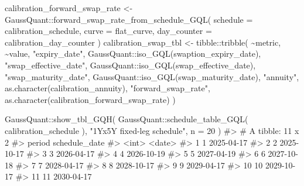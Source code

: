 \documentclass[
  letterpaper,
  DIV=11,
  numbers=noendperiod]{scrreprt}
\newenvironment{Shaded}{\begin{snugshade}}{\end{snugshade}}
\newcommand{\AttributeTok}[1]{\textcolor[rgb]{0.40,0.45,0.13}{#1}}
\newcommand{\CommentTok}[1]{\textcolor[rgb]{0.37,0.37,0.37}{#1}}
\newcommand{\DecValTok}[1]{\textcolor[rgb]{0.68,0.00,0.00}{#1}}
\newcommand{\FunctionTok}[1]{\textcolor[rgb]{0.28,0.35,0.67}{#1}}
\newcommand{\NormalTok}[1]{\textcolor[rgb]{0.00,0.23,0.31}{#1}}
\newcommand{\OtherTok}[1]{\textcolor[rgb]{0.00,0.23,0.31}{#1}}
\newcommand{\SpecialCharTok}[1]{\textcolor[rgb]{0.37,0.37,0.37}{#1}}
\newcommand{\StringTok}[1]{\textcolor[rgb]{0.13,0.47,0.30}{#1}}
\begin{document}
\begin{Shaded}
\begin{Highlighting}[]
\NormalTok{calibration\_forward\_swap\_rate }\OtherTok{\textless{}{-}}\NormalTok{ GaussQuant}\SpecialCharTok{::}\FunctionTok{forward\_swap\_rate\_from\_schedule\_GQL}\NormalTok{(}
  \AttributeTok{schedule =}\NormalTok{ calibration\_schedule,}
  \AttributeTok{curve =}\NormalTok{ flat\_curve,}
  \AttributeTok{day\_counter =}\NormalTok{ calibration\_day\_counter}
\NormalTok{)}
\NormalTok{calibration\_swap\_tbl }\OtherTok{\textless{}{-}}\NormalTok{ tibble}\SpecialCharTok{::}\FunctionTok{tribble}\NormalTok{(}
  \SpecialCharTok{\textasciitilde{}}\NormalTok{metric,                }\SpecialCharTok{\textasciitilde{}}\NormalTok{value,}
  \StringTok{"expiry\_date"}\NormalTok{,           GaussQuant}\SpecialCharTok{::}\FunctionTok{iso\_GQL}\NormalTok{(swaption\_expiry\_date),}
  \StringTok{"swap\_effective\_date"}\NormalTok{,   GaussQuant}\SpecialCharTok{::}\FunctionTok{iso\_GQL}\NormalTok{(swap\_effective\_date),}
  \StringTok{"swap\_maturity\_date"}\NormalTok{,    GaussQuant}\SpecialCharTok{::}\FunctionTok{iso\_GQL}\NormalTok{(swap\_maturity\_date),}
  \StringTok{"annuity"}\NormalTok{,               }\FunctionTok{as.character}\NormalTok{(calibration\_annuity),}
  \StringTok{"forward\_swap\_rate"}\NormalTok{,     }\FunctionTok{as.character}\NormalTok{(calibration\_forward\_swap\_rate)}
\NormalTok{)}

\NormalTok{GaussQuant}\SpecialCharTok{::}\FunctionTok{show\_tbl\_GQH}\NormalTok{(}
\NormalTok{  GaussQuant}\SpecialCharTok{::}\FunctionTok{schedule\_table\_GQL}\NormalTok{(}
\NormalTok{    calibration\_schedule}
\NormalTok{  ),}
  \StringTok{"1Yx5Y fixed{-}leg schedule"}\NormalTok{,}
  \AttributeTok{n =} \DecValTok{20}
\NormalTok{)}
\CommentTok{\#\textgreater{} \# A tibble: 11 x 2}
\CommentTok{\#\textgreater{}    period schedule\_date}
\CommentTok{\#\textgreater{}     \textless{}int\textgreater{} \textless{}date\textgreater{}       }
\CommentTok{\#\textgreater{}  1      1 2025{-}04{-}17   }
\CommentTok{\#\textgreater{}  2      2 2025{-}10{-}17   }
\CommentTok{\#\textgreater{}  3      3 2026{-}04{-}17   }
\CommentTok{\#\textgreater{}  4      4 2026{-}10{-}19   }
\CommentTok{\#\textgreater{}  5      5 2027{-}04{-}19   }
\CommentTok{\#\textgreater{}  6      6 2027{-}10{-}18   }
\CommentTok{\#\textgreater{}  7      7 2028{-}04{-}17   }
\CommentTok{\#\textgreater{}  8      8 2028{-}10{-}17   }
\CommentTok{\#\textgreater{}  9      9 2029{-}04{-}17   }
\CommentTok{\#\textgreater{} 10     10 2029{-}10{-}17   }
\CommentTok{\#\textgreater{} 11     11 2030{-}04{-}17}


\end{Highlighting}
\end{Shaded}
\end{document}
